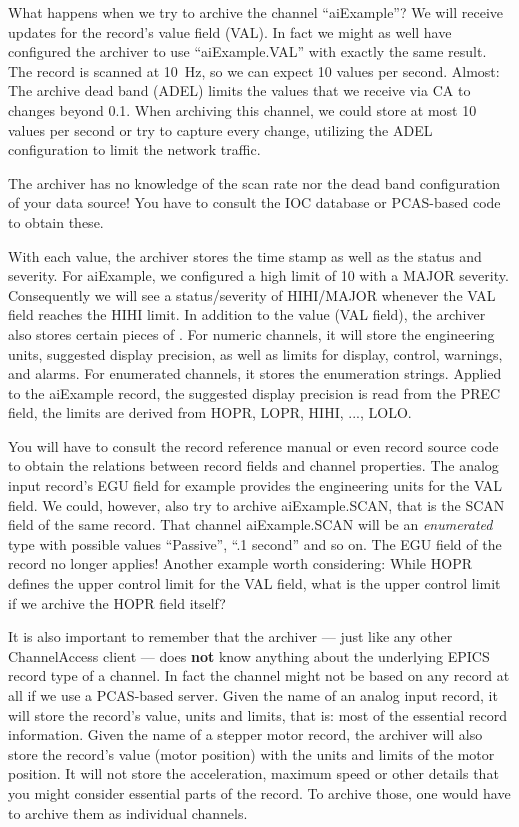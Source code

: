  

\noindent What happens when we try to archive the channel ``aiExample''?
We will receive updates for the record's value field (VAL). In fact we
might as well have configured the archiver to use ``aiExample.VAL''
with exactly the same result.
The record is scanned at 10~Hz, so we can expect 10 values per second.
Almost: The archive dead band (ADEL) limits the values that we receive
via CA to changes beyond 0.1. When archiving this channel, we could
store at most 10 values per second or try to capture every change,
utilizing the ADEL configuration to limit the network traffic.

\NOTE The archiver has no knowledge of the scan rate nor the dead band
configuration of your data source! You have to consult the IOC
database or PCAS-based code to obtain these.

With each value, the archiver stores the time stamp as well as the
status and severity. For aiExample, we configured a high limit of 10
with a MAJOR severity. Consequently we will see a status/severity of
HIHI/MAJOR whenever the VAL field reaches the HIHI limit.
In addition to the value (VAL field), the archiver also stores certain
pieces of . For numeric channels, it will store the
engineering units, suggested display precision, as well as limits for
display, control, warnings, and alarms. For enumerated channels, it
stores the enumeration strings.
Applied to the aiExample record, the suggested display precision is
read from the PREC field, the limits are derived from HOPR, LOPR,
HIHI, ..., LOLO.

\NOTE You will have to consult the record reference manual or even
record source code to obtain the relations between record fields and
channel properties. The analog input record's EGU field for example
provides the engineering units for the VAL field. We could, however,
also try to archive aiExample.SCAN, that is the SCAN field of the same
record. That channel aiExample.SCAN will be an \emph{enumerated} type
with possible values ``Passive'', ``.1 second'' and so on. The EGU
field of the record no longer applies!
Another example worth considering: While HOPR defines the upper
control limit for the VAL field, what is the upper control limit if we
archive the HOPR field itself?

It is also important to remember that the archiver
--- just like any other ChannelAccess client --- does {\bfseries not} know
anything about the underlying EPICS record type of a channel. In fact
the channel might not be based on any record at all if we use a
PCAS-based server.
Given the name of an analog input record, it will store the record's
value, units and limits, that is: most of the essential record
information. Given the name of a stepper motor record, the
archiver will also store the record's value (motor position) with the
units and limits of the motor position. It will not store the
acceleration, maximum speed or other details that you might consider
essential parts of the record. To archive those, one would have to
archive them as individual channels.

